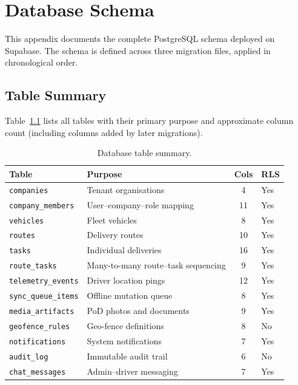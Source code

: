 ﻿%
\chapter{Database Schema}
\label{app:schema}

This appendix documents the complete PostgreSQL schema deployed on Supabase.
The schema is defined across three migration files, applied in chronological order.

\section{Table Summary}

Table~\ref{tab:schema-summary} lists all tables with their primary purpose and
approximate column count (including columns added by later migrations).

\begin{table}[H]
\centering
\caption{Database table summary.}
\label{tab:schema-summary}
\begin{tabular}{@{}llcl@{}}
\toprule
\textbf{Table} & \textbf{Purpose} & \textbf{Cols} & \textbf{RLS}\\
\midrule
\texttt{companies}           & Tenant organisations   & 4  & Yes \\
\texttt{company\_members}    & User--company--role mapping & 11 & Yes \\
\texttt{vehicles}            & Fleet vehicles         & 8  & Yes \\
\texttt{routes}              & Delivery routes        & 10 & Yes \\
\texttt{tasks}               & Individual deliveries  & 16 & Yes \\
\texttt{route\_tasks}        & Many-to-many route--task sequencing & 9 & Yes \\
\texttt{telemetry\_events}   & Driver location pings  & 12 & Yes \\
\texttt{sync\_queue\_items}  & Offline mutation queue  & 8  & Yes \\
\texttt{media\_artifacts}    & PoD photos and documents & 9 & Yes \\
\texttt{geofence\_rules}     & Geo-fence definitions  & 8  & No  \\
\texttt{notifications}       & System notifications   & 7  & Yes \\
\texttt{audit\_log}          & Immutable audit trail  & 6  & No  \\
\texttt{chat\_messages}      & Admin--driver messaging & 7  & Yes \\
\bottomrule
\end{tabular}
\end{table}

